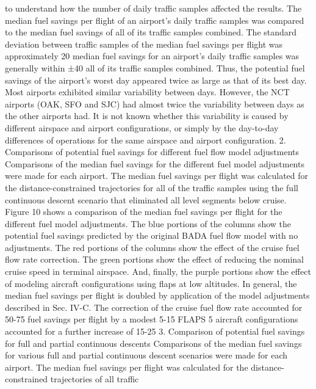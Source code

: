 \documentclass{aer1315-pretty}
\begin{document}
\begin{itemize}
to understand how the number of daily traffic samples affected the results. The median fuel savings per flight of an
airport’s daily traffic samples was compared to the median fuel savings of all of its traffic samples combined. The
standard deviation between traffic samples of the median fuel savings per flight was approximately 20%
median fuel savings for an airport’s daily traffic samples was generally within ±40%
all of its traffic samples combined. Thus, the potential fuel savings of the airport’s worst day appeared twice as large
as that of its best day. Most airports exhibited similar variability between days. However, the NCT airports (OAK,
SFO and SJC) had almost twice the variability between days as the other airports had. It is not known whether this
variability is caused by different airspace and airport configurations, or simply by the day-to-day differences of
operations for the same airspace and airport configuration.
    2. Comparisons of potential fuel savings for different fuel flow model adjustments
    Comparisons of the median fuel savings for the different fuel model adjustments were made for each airport. The
median fuel savings per flight was calculated for the distance-constrained trajectories for all of the traffic samples
using the full continuous descent scenario that eliminated all level segments below cruise.
    Figure 10 shows a comparison of the median fuel savings per flight for the different fuel model adjustments. The
blue portions of the columns show the potential fuel savings predicted by the original BADA fuel flow model with
no adjustments. The red portions of the columns show the effect of the cruise fuel flow rate correction. The green
portions show the effect of reducing the nominal cruise speed in terminal airspace. And, finally, the purple portions
show the effect of modeling aircraft configurations using flaps at low altitudes. In general, the median fuel savings
per flight is doubled by application of the model adjustments described in Sec. IV-C. The correction of the cruise
fuel flow rate accounted for 50-75%
fuel savings per flight by a modest 5-15%
FLAPS 5 aircraft configurations accounted for a further increase of 15-25%
    3. Comparison of potential fuel savings for full and partial continuous descents
    Comparisons of the median fuel savings for various full and partial continuous descent scenarios were made for
each airport. The median fuel savings per flight was calculated for the distance-constrained trajectories of all traffic

\end{itemize}
\end{document}
